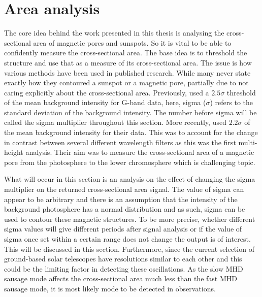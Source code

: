 \section{Area analysis}

	The core idea behind the work presented in this thesis is analysing the cross-sectional area of magnetic pores and sunspots.
	So it is vital to be able to confidently measure the cross-sectional area.
    The base idea is to threshold the structure and use that as a measure of its cross-sectional area.
    The issue is how various methods have been used in published research.
    While many never state exactly how they contoured a sunspot or a magnetic pore, partially due to not caring explicitly about the cross-sectional area.
    Previously, \cite{morton2011} used a $2.5\sigma$ threshold of the mean background intensity for G-band data, here, sigma ($\sigma$) refers to the standard deviation of the background intensity.
    The number before sigma will be called the sigma multiplier throughout this section.
	More recently, \cite{0004-637X-806-1-132} used $2.2\sigma$ of the mean background intensity for their data.
    This was to account for the change in contrast between several different wavelength filters as this was the first multi-height analysis.
    Their aim was to measure the cross-sectional area of a magnetic pore from the photosphere to the lower chromosphere which is challenging topic.
	
	What will occur in this section is an analysis on the effect of changing the sigma multiplier on the returned cross-sectional area signal.
    The value of sigma can appear to be arbitrary and there is an assumption that the intensity of the background photosphere has a normal distribution and as such, sigma can be used to contour these magnetic structures.
    To be more precise, whether different sigma values will give different periods after signal analysis or if the value of sigma once set within a certain range does not change the output is of interest.
    This will be discussed in this section.
    Furthermore, since the current selection of ground-based solar telescopes have resolutions similar to each other and this could be the limiting factor in detecting these oscillations.
    As the slow MHD sausage mode affects the cross-sectional area much less than the fast MHD sausage mode, it is most likely mode to be detected in observations.
    
